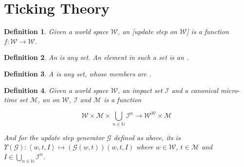 \documentclass{book}
\newtheorem{definition}{Definition}
\theoremstyle{definition}\newtheorem{mechanism}{Mechanism}
\theoremstyle{remark}\newtheorem*{remark}{Remark}
\begin{document}

\section{Ticking Theory}

\begin{definition}
	Given a world space $\mathcal W$, an [update step on $\mathcal W$] is a function $f: \mathcal W \to \mathcal W$.
\end{definition}

\begin{definition}
	An  is any set. An element in such a set is an .
\end{definition}

\begin{definition}
	A  is any set, whose members are .
\end{definition}

\begin{definition}
	Given a world space $\mathcal W$, an impact set $\mathcal I$ and a canonical micro-time set $\mathcal M$, an  on $\mathcal W$, $\mathcal I$ and $\mathcal M$ is a function
	
	\begin{equation*}
		\mathcal W \times \mathcal M \times \bigcup_{n \in \mathbb N} \mathcal I^n \to \mathcal W^{\mathcal W} \times \mathcal M
	\end{equation*}
	
	And for the update step generator $\mathcal G$ defined as above, its  is $\Upsilon\left(\mathcal G\right): \left<w, t, I\right> \mapsto (\mathcal{G}(w, t))(w, t, I)$ where $w\in \mathcal W$, $t\in \mathcal M$ and $I \in \bigcup_{n \in \mathbb N} \mathcal I^n$.
\end{definition}
\end{document}
